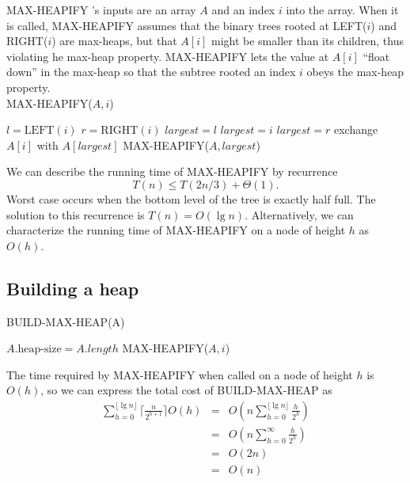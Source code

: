 \documentclass[12pt]{article}
\begin{document}
MAX-HEAPIFY 's inputs are an array $A$ and an index $i$ into the array. When it is called, MAX-HEAPIFY assumes that the binary trees rooted at LEFT($i$) and RIGHT($i$) are max-heaps, but that $A[i]$ might be smaller than its children, thus violating he max-heap property. MAX-HEAPIFY lets the value at $A[i]$ ``float down'' in the max-heap so that the subtree rooted an index $i$ obeys the max-heap property. \\

 MAX-HEAPIFY($A,i$)
\begin{algorithmic}[1]
\State $l = \text {LEFT}(i)$
\State $r = \text {RIGHT}(i)$
	\State $largest = l$
\Else
	\State $largest = i$
\EndIf
{}
	\State $largest = r$
\EndIf
{}
	\State exchange $A[i]$ with $A[largest]$
        \State MAX-HEAPIFY($A, largest$)
\EndIf
\end{algorithmic}

We can describe the running time of MAX-HEAPIFY by recurrence
\begin{equation*}
  T(n) \le T(2n/3) + \Theta(1).
\end{equation*}
Worst case occurs when the bottom level of the tree is exactly half full. The solution to this recurrence is $T(n) = O(\lg n)$. Alternatively, we can characterize the running time of MAX-HEAPIFY on a node of height $h$ as $O(h)$.

\subsection{Building a heap}

BUILD-MAX-HEAP(A)
\begin{algorithmic}[1]
\State $A.\text{heap-size} = A.length$
	\State MAX-HEAPIFY($A, i$)
\EndFor
\end{algorithmic}

The time required by MAX-HEAPIFY when called on a node of height $h$ is $O(h)$, so we can express the total cost of BUILD-MAX-HEAP as
\begin{eqnarray*}
  \sum_{h=0}^{\lfloor \lg n \rfloor} \lceil \frac {n}{2^{h+1}} \rceil O(h)
  &=& O(n \sum_{h=0}^{\lfloor \lg n \rfloor} \frac {h}{2^h}) \\
  &=& O(n \sum_{h=0}^{\infty} \frac {h}{2^h}) \\
  &=& O(2n) \\
  &=& O(n)
\end{eqnarray*}
\end{document}
